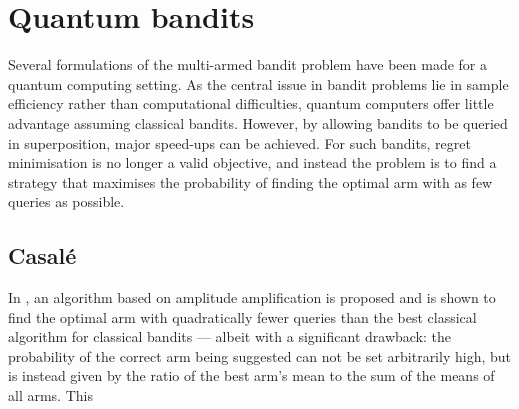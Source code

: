 \chapter{Quantum bandits}
\label{chap:qbandits}

Several formulations of the multi-armed bandit problem have been made for a quantum computing setting.
As the central issue in bandit problems lie in sample efficiency rather than computational difficulties, quantum computers offer little advantage assuming classical bandits.
However, by allowing bandits to be queried in superposition, major speed-ups can be achieved.
For such bandits, regret minimisation is no longer a valid objective, and instead the problem is to find a strategy that maximises the probability of finding the optimal arm with as few queries as possible.

\section{Casalé}
In \cite{casale2020}, an algorithm based on amplitude amplification is proposed and is shown to find the optimal arm with quadratically fewer queries than the best classical algorithm for classical bandits — albeit with a significant drawback: the probability of the correct arm being suggested can not be set arbitrarily high, but is instead given by the ratio of the best arm's mean to the sum of the means of all arms.
This